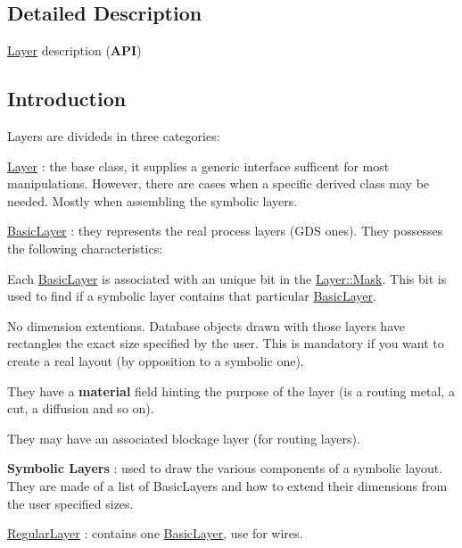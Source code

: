 \subsection{Detailed Description}
\hyperlink{classHurricane_1_1Layer}{Layer} description ({\bfseries A\-P\-I}) 

\hypertarget{classHurricane_1_1Layer_secLayerIntro}{}\subsection{Introduction}\label{classHurricane_1_1Layer_secLayerIntro}
Layers are divideds in three categories\-: 
\begin{DoxyItemize}
\item \hyperlink{classHurricane_1_1Layer}{Layer} \-: the base class, it supplies a generic interface sufficent for most manipulations. However, there are cases when a specific derived class may be needed. Mostly when assembling the symbolic layers. 
\item \hyperlink{classHurricane_1_1BasicLayer}{Basic\-Layer} \-: they represents the real process layers (G\-D\-S ones). They possesses the following characteristics\-: 
\begin{DoxyItemize}
\item Each \hyperlink{classHurricane_1_1BasicLayer}{Basic\-Layer} is associated with an unique bit in the \hyperlink{classHurricane_1_1Layer_af5277c670637bd5d910237e7afe01a91}{Layer\-::\-Mask}. This bit is used to find if a symbolic layer contains that particular \hyperlink{classHurricane_1_1BasicLayer}{Basic\-Layer}. 
\item No dimension extentions. Database objects drawn with those layers have rectangles the exact size specified by the user. This is mandatory if you want to create a real layout (by opposition to a symbolic one). 
\item They have a {\bfseries material} field hinting the purpose of the layer (is a routing metal, a cut, a diffusion and so on). 
\item They may have an associated blockage layer (for routing layers). 
\end{DoxyItemize}
\item {\bfseries Symbolic Layers} \-: used to draw the various components of a symbolic layout. They are made of a list of Basic\-Layers and how to extend their dimensions from the user specified sizes. 
\begin{DoxyItemize}
\item \hyperlink{classHurricane_1_1RegularLayer}{Regular\-Layer} \-: contains one \hyperlink{classHurricane_1_1BasicLayer}{Basic\-Layer}, use for wires. 

\end{DoxyItemize}
\end{DoxyItemize}

